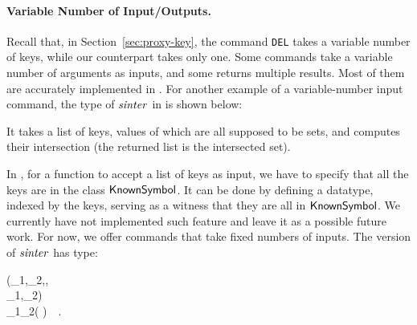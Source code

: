 \paragraph{Variable Number of Input/Outputs.} Recall that, in
Section~\ref{sec:proxy-key}, the \Redis{} command \texttt{DEL} takes a variable
number of keys, while our \Edis{} counterpart takes only one. Some \Redis{}
commands take a variable number of arguments as inputs, and some returns
multiple results. Most of them are accurately implemented in \Hedis{}. For
another example of a variable-number input command, the type of \ensuremath{\Varid{sinter}} in
\Hedis{} is shown below:
\resethooks
It takes a list of keys, values of which are all supposed to be sets, and
computes their intersection (the returned list is the intersected set).

In \Edis{}, for a function to accept a list of keys as input, we have to
specify that all the keys are in the class \ensuremath{\Conid{KnownSymbol}}. It can be done by
defining a datatype, indexed by the keys, serving as a witness that they
are all in \ensuremath{\Conid{KnownSymbol}}. We currently have not implemented such feature and
leave it as a possible future work. For now, we offer commands that take fixed
numbers of inputs. The \Edis{} version of \ensuremath{\Varid{sinter}} has type:
\begin{hscode}\SaveRestoreHook
{}%
%
%
%
\>[B]{}\mathbin{::}{}\<[12]%
\>[12]{}({}\<[15]%
\>[15]{}\;_{1},\;_{2},\;,{}\<[E]%
\\
\>[15]{}\;\mathrel{\sim}\;\;_{1},\;\mathrel{\sim}\;\;_{2}){}\<[E]%
\\
\>[12]{}\Rightarrow {}\;_{1}\to {}\;_{2}\to {}\;\;\;( )~~.{}\<[E]%
\ColumnHook
\end{hscode}\resethooks

